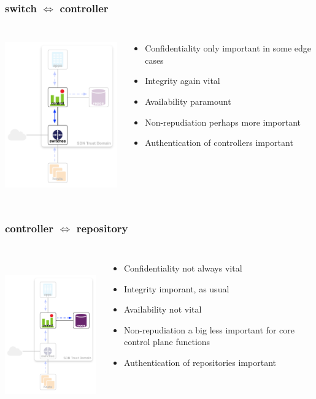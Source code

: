 \documentclass[t,handout]{beamer}
\begin{document}
\begin{frame}
\frametitle{switch $\Longleftrightarrow$  controller}
\begin{columns}[T]
\includegraphics[height=2.75in]{ra-sw-c}
\begin{itemize}
\item {\color{orange} Confidentiality only important in some edge cases}
\item {\color{red} Integrity again vital}
\item {\color{red} Availability paramount} 
\item {\color{orange} Non-repudiation perhaps more important}
\item {\color{red} Authentication of controllers important}
\end{itemize}
\end{columns}
\end{frame}

\begin{frame}
\frametitle{controller $\Longleftrightarrow$ repository}
\begin{columns}[T]
\includegraphics[height=2.75in]{ra-c-r}
\begin{itemize}
\item {\color{orange} Confidentiality not always vital}
\item {\color{red} Integrity imporant, as usual}
\item {\color{green} Availability not vital} 
\item {\color{green} Non-repudiation a big less important for core control plane functions}
\item {\color{red} Authentication of repositories important}
\end{itemize}
\end{columns}
\end{frame}
\end{document}
